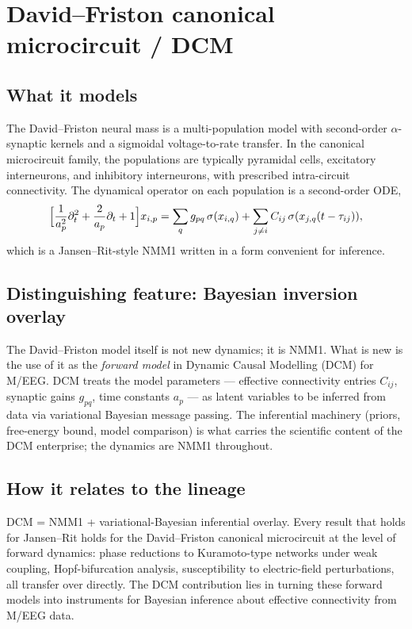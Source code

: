 \documentclass[11pt,a4paper]{article}
\begin{document}
\section{David--Friston canonical microcircuit / DCM}
\label{sec:dcm}

\subsection{What it models}

The David--Friston neural mass\cite{DavidFriston2003} is a multi-population model with second-order $\alpha$-synaptic kernels and a sigmoidal voltage-to-rate transfer. In the canonical microcircuit family\cite{Bastos2012Canonical}, the populations are typically pyramidal cells, excitatory interneurons, and inhibitory interneurons, with prescribed intra-circuit connectivity. The dynamical operator on each population is a second-order ODE,
\begin{equation}
\label{eq:dcm}
\Bigl[\frac{1}{a_p^2}\partial_t^2 + \frac{2}{a_p}\partial_t + 1\Bigr] x_{i,p} = \sum_q g_{pq}\,\sigma(x_{i,q}) + \sum_{j\neq i} C_{ij}\,\sigma(x_{j,q}(t-\tau_{ij})),
\end{equation}
which is a Jansen--Rit-style NMM1 written in a form convenient for inference.

\subsection{Distinguishing feature: Bayesian inversion overlay}

The David--Friston model itself is not new dynamics; it is NMM1. What is new is the use of it as the \emph{forward model} in Dynamic Causal Modelling (DCM) for M/EEG. DCM treats the model parameters --- effective connectivity entries $C_{ij}$, synaptic gains $g_{pq}$, time constants $a_p$ --- as latent variables to be inferred from data via variational Bayesian message passing. The inferential machinery (priors, free-energy bound, model comparison) is what carries the scientific content of the DCM enterprise; the dynamics are NMM1 throughout.

\subsection{How it relates to the lineage}

DCM = NMM1 + variational-Bayesian inferential overlay. Every result that holds for Jansen--Rit holds for the David--Friston canonical microcircuit at the level of forward dynamics: phase reductions to Kuramoto-type networks under weak coupling\cite{ForresterEtAl2020}, Hopf-bifurcation analysis, susceptibility to electric-field perturbations, all transfer over directly. The DCM contribution lies in turning these forward models into instruments for Bayesian inference about effective connectivity from M/EEG data.
\end{document}
